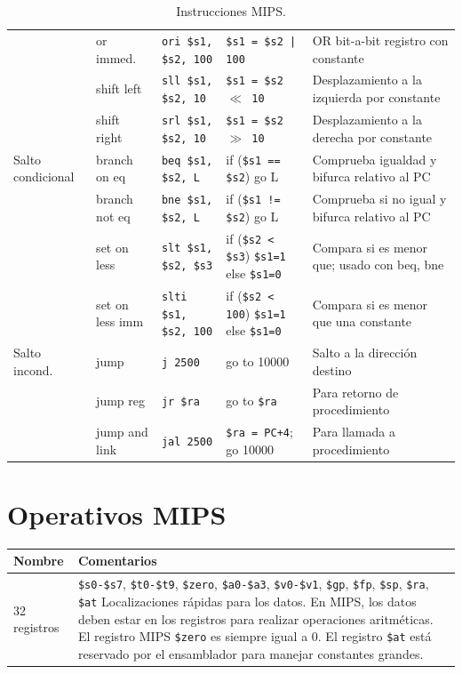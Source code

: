 \documentclass[12pt,a4paper]{article}
\begin{document}
\begin{table}[h!]
\begin{tabularx}{\textwidth}{>{\raggedright\arraybackslash}p{2.2cm} >{\raggedright\arraybackslash}p{2.2cm} >{\raggedright\arraybackslash}p{3cm} >{\raggedright\arraybackslash}p{3.5cm} X}
			& or immed. & \texttt{ori \$s1, \$s2, 100} & \texttt{\$s1 = \$s2 | 100} & OR bit-a-bit registro con constante \\
			& shift left & \texttt{sll \$s1, \$s2, 10} & \texttt{\$s1 = \$s2 $\ll$ 10} & Desplazamiento a la izquierda por constante \\
			& shift right & \texttt{srl \$s1, \$s2, 10} & \texttt{\$s1 = \$s2 $\gg$ 10} & Desplazamiento a la derecha por constante \\
			\midrule
			Salto condicional 
			& branch on eq & \texttt{beq \$s1, \$s2, L} & if (\texttt{\$s1 == \$s2}) go L & Comprueba igualdad y bifurca relativo al PC \\
			& branch not eq & \texttt{bne \$s1, \$s2, L} & if (\texttt{\$s1 != \$s2}) go L & Comprueba si no igual y bifurca relativo al PC \\
			& set on less & \texttt{slt \$s1, \$s2, \$s3} & if (\texttt{\$s2 < \$s3}) \texttt{\$s1=1} else \texttt{\$s1=0} & Compara si es menor que; usado con beq, bne \\
			& set on less imm & \texttt{slti \$s1, \$s2, 100}& if (\texttt{\$s2 < 100}) \texttt{\$s1=1} else \texttt{\$s1=0} & Compara si es menor que una constante \\
			\midrule
			Salto incond. 
			& jump & \texttt{j 2500} & go to 10000 & Salto a la dirección destino \\
			& jump reg & \texttt{jr \$ra} & go to \texttt{\$ra} & Para retorno de procedimiento \\
			& jump and link & \texttt{jal 2500} & \texttt{\$ra = PC+4}; go 10000 & Para llamada a procedimiento \\
			\bottomrule
		\end{tabularx}
		\caption{Instrucciones MIPS.}
	\end{table}
	
	\section*{Operativos MIPS}
	
	\begin{table}[h!]
		\centering
		\begin{tabularx}{\textwidth}{l X}
			\toprule
			\textbf{Nombre} & \textbf{Comentarios} \\
			\midrule
			32 registros & \texttt{\$s0-\$s7}, \texttt{\$t0-\$t9}, \texttt{\$zero}, \texttt{\$a0-\$a3}, \texttt{\$v0-\$v1}, \texttt{\$gp}, \texttt{\$fp}, \texttt{\$sp}, \texttt{\$ra}, \texttt{\$at} \newline Localizaciones rápidas para los datos. En MIPS, los datos deben estar en los registros para realizar operaciones aritméticas. El registro MIPS \texttt{\$zero} es siempre igual a 0. El registro \texttt{\$at} está reservado por el ensamblador para manejar constantes grandes. \\
			\bottomrule
		\end{tabularx}
		
	\end{table}
	
\end{document}
